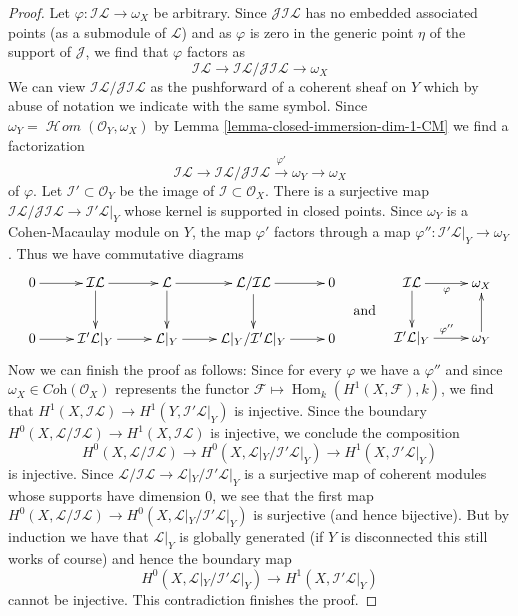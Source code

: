\documentclass{stacks-project}
\theoremstyle{plain}
\theoremstyle{definition}
\theoremstyle{remark}
\numberwithin{equation}{subsection}
\def\Hom{\mathop{\mathrm{Hom}}\nolimits}
\def\SheafHom{\mathop{\mathcal{H}\!\mathit{om}}\nolimits}
\begin{document}
\begin{proof}
\medskip\noindent
Let $\varphi : \mathcal{I}\mathcal{L} \to \omega_X$ be arbitrary.
Since $\mathcal{J}\mathcal{I}\mathcal{L}$
has no embedded associated points
(as a submodule of $\mathcal{L}$) and as $\varphi$ is zero
in the generic point $\eta$ of the support of $\mathcal{J}$, we find that
$\varphi$ factors as
$$
\mathcal{I}\mathcal{L} \to
\mathcal{I}\mathcal{L}/\mathcal{J}\mathcal{I}\mathcal{L} \to \omega_X
$$
We can view $\mathcal{I}\mathcal{L}/\mathcal{J}\mathcal{I}\mathcal{L}$
as the pushforward of a coherent sheaf on $Y$ which by abuse of
notation we indicate with the same symbol.
Since $\omega_Y = \SheafHom(\mathcal{O}_Y, \omega_X)$
by Lemma \ref{lemma-closed-immersion-dim-1-CM}
we find a factorization
$$
\mathcal{I}\mathcal{L} \to
\mathcal{I}\mathcal{L}/
\mathcal{J}\mathcal{I}\mathcal{L} 
\xrightarrow{\varphi'} \omega_Y \to \omega_X
$$
of $\varphi$. Let $\mathcal{I}' \subset \mathcal{O}_Y$ be the
image of $\mathcal{I} \subset \mathcal{O}_X$. There is a surjective map
$\mathcal{I}\mathcal{L}/\mathcal{J}\mathcal{I}\mathcal{L} \to
\mathcal{I}'\mathcal{L}|_Y$ whose kernel is supported in closed points.
Since $\omega_Y$ is a Cohen-Macaulay module on $Y$, the map $\varphi'$
factors through a map
$\varphi'' : \mathcal{I}'\mathcal{L}|_Y \to \omega_Y$.
Thus we have commutative diagrams
$$
\vcenter{
\xymatrix{
0 \ar[r] &
\mathcal{I}\mathcal{L} \ar[r] \ar[d] &
\mathcal{L} \ar[r] \ar[d] &
\mathcal{L}/\mathcal{I}\mathcal{L} \ar[r] \ar[d] &
0 \\
0 \ar[r] &
\mathcal{I}'\mathcal{L}|_Y \ar[r] &
\mathcal{L}|_Y \ar[r] &
\mathcal{L}|_Y/\mathcal{I}'\mathcal{L}|_Y \ar[r] &
0
}
}
\quad\text{and}\quad
\vcenter{
\xymatrix{
\mathcal{I}\mathcal{L} \ar[r]_\varphi \ar[d] & \omega_X \\
\mathcal{I}'\mathcal{L}|_Y \ar[r]^{\varphi''} & \omega_Y \ar[u]
}
}
$$
Now we can finish the proof as follows:
Since for every $\varphi$ we have a $\varphi''$ and since
$\omega_X \in \textit{Coh}(\mathcal{O}_X)$
represents the functor $\mathcal{F} \mapsto \Hom_k(H^1(X, \mathcal{F}), k)$,
we find that
$H^1(X, \mathcal{I}\mathcal{L}) \to H^1(Y, \mathcal{I}'\mathcal{L}|_Y)$
is injective. Since the boundary
$H^0(X, \mathcal{L}/\mathcal{I}\mathcal{L}) \to H^1(X, \mathcal{I}\mathcal{L})$
is injective, we conclude the composition
$$
H^0(X, \mathcal{L}/\mathcal{I}\mathcal{L}) \to
H^0(X, \mathcal{L}|_Y/\mathcal{I}'\mathcal{L}|_Y) \to
H^1(X, \mathcal{I}'\mathcal{L}|_Y)
$$
is injective. Since
$\mathcal{L}/\mathcal{I}\mathcal{L} \to
\mathcal{L}|_Y/\mathcal{I}'\mathcal{L}|_Y$
is a surjective map of coherent modules whose supports have
dimension $0$, we see that the first map
$H^0(X, \mathcal{L}/\mathcal{I}\mathcal{L}) \to
H^0(X, \mathcal{L}|_Y/\mathcal{I}'\mathcal{L}|_Y)$
is surjective (and hence bijective).
But by induction we have that $\mathcal{L}|_Y$ is globally
generated (if $Y$ is disconnected this still works of course)
and hence the boundary map
$$
H^0(X, \mathcal{L}|_Y/\mathcal{I}'\mathcal{L}|_Y) \to
H^1(X, \mathcal{I}'\mathcal{L}|_Y)
$$
cannot be injective.
This contradiction finishes the proof.
\end{proof}
\end{document}
